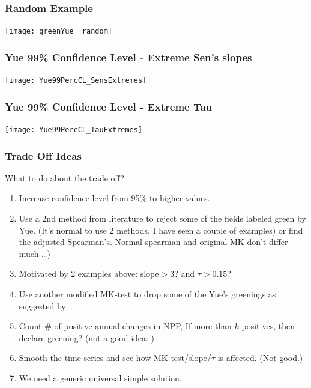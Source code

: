 \documentclass[serif, xcolor={dvipsnames}]{beamer} %
\begin{document}
\begin{frame}
\frametitle{Random Example}
\begin{center}
\texttt{[image: greenYue\_ random]}
\end{center}
\end{frame}
\begin{frame}[t]
\frametitle{Yue 99\% Confidence Level - Extreme Sen's slopes}
\begin{center}
\texttt{[image: Yue99PercCL\_SensExtremes]}
\end{center}
\end{frame}
\begin{frame}[t]
\frametitle{Yue 99\% Confidence Level - Extreme Tau}
\begin{center}
\texttt{[image: Yue99PercCL\_TauExtremes]}
\end{center}
\end{frame}
\begin{frame}[t]
\frametitle{Trade Off Ideas}
\vspace{-.15in}
What to do about the trade off? 
\begin{enumerate}
\item Increase confidence level from 95\% to higher values.
\item Use a 2nd method from literature to reject some of the fields labeled green by Yue. 
(It's normal to use 2 methods. I have seen a couple of examples)
or find the adjusted Spearman's. Normal spearman and original MK don't differ much \dots) 
\item Motivated by 2 examples above: slope$ > 3$? and $\tau> 0.15$? 
\item Use another modified MK-test to drop some of the Yue's greenings as suggested by~\cite{blain2013modified}.
\item Count \# of positive annual changes in NPP,
If more than $k$ positives, then declare greening? (not a good idea: )
\item Smooth the time-series and see how MK test/slope/$\tau$ is affected.
(Not good.)
\item We need a generic universal simple solution.
\end{enumerate}
\end{frame}
\end{document}
